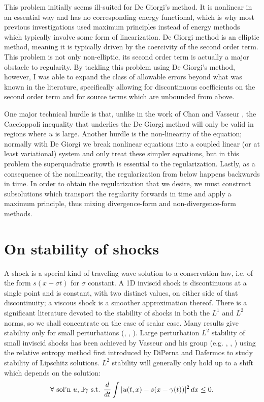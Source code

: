This problem initially seems ill-suited for De Giorgi's method.  It is nonlinear in an essential way and has no corresponding energy functional, which is why most previous investigations used maximum principles instead of energy methods which typically involve some form of linearization.  De Giorgi method is an elliptic method, meaning it is typically driven by the coercivity of the second order term.  This problem is not only non-elliptic, its second order term is actually a major obstacle to regularity.  By tackling this problem using De Giorgi's method, however, I was able to expand the class of allowable errors beyond what was known in the literature, specifically allowing for discontinuous coefficients on the second order term and for source terms which are unbounded from above.  

One major technical hurdle is that, unlike in the work of Chan and Vasseur \cite{ChVa}, the Caccioppoli inequality that underlies the De Giorgi method will only be valid in regions where $u$ is large.  Another hurdle is the non-linearity of the equation; normally with De Giorgi we break nonlinear equations into a coupled linear (or at least variational) system and only treat these simpler equations, but in this problem the superquadratic growth is essential to the regularization.   Lastly, as a consequence of the nonlinearity, the regularization from below happens backwards in time.  In order to obtain the regularization that we desire, we must construct subsolutions which transport the regularity forwards in time and apply a maximum principle, thus mixing divergence-form and non-divergence-form methods.  


\section{On stability of shocks} \label{sec:shocks}
A shock is a special kind of traveling wave solution to a conservation law, i.e. of the form $s(x-\sigma t)$ for $\sigma$ constant.  A 1D inviscid shock is discontinuous at a single point and is constant, with two distinct values, on either side of that discontinuity; a viscous shock is a smoother approximation thereof.  There is a significant literature devoted to the stability of shocks in both the $L^1$ and $L^2$ norms, so we shall concentrate on the case of scalar case.  Many results give stability only for small perturbations (\cite{FrSe}, \cite{Kr.entropy}, \cite{IlOl}).  Large perturbation $L^2$ stability of small inviscid shocks has been achieved by Vasseur and his group (e.g. \cite{SeVa}, \cite{LeVa}, \cite{Le}) using the relative entropy method first introduced by DiPerna and Dafermos \cite{Da} to study stability of Lipschitz solutions.  $L^2$ stability will generally only hold up to a shift which depends on the solution:
\[ \forall \textrm{ sol'n } u, \exists \gamma \textrm{ s.t. } \frac{d}{dt} \int |u(t,x) - s(x-\gamma(t))|^2 \,dx \leq 0. \]

